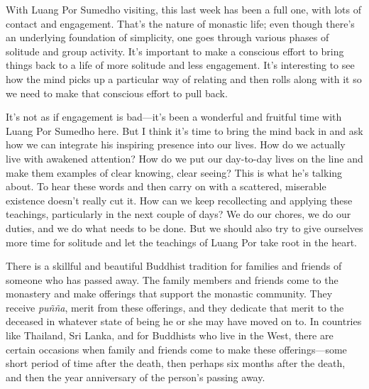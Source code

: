 
With Luang Por Sumedho visiting, this last week has been a full one, 
with lots of contact and engagement. That's the nature of monastic 
life; even though there's an underlying foundation of simplicity, one 
goes through various phases of solitude and group activity. It's 
important to make a conscious effort to bring things back to a life of 
more solitude and less engagement. It's interesting to see how the mind 
picks up a particular way of relating and then rolls along with it so 
we need to make that conscious effort to pull back.

It's not as if engagement is bad---it's been a wonderful and fruitful 
time with Luang Por Sumedho here. But I think it's time to bring the 
mind back in and ask how we can integrate his inspiring presence into 
our lives. How do we actually live with awakened attention? How do we 
put our day-to-day lives on the line and make them examples of clear 
knowing, clear seeing? This is what he's talking about. To hear these 
words and then carry on with a scattered, miserable existence doesn't 
really cut it. How can we keep recollecting and applying these 
teachings, particularly in the next couple of days? We do our chores, 
we do our duties, and we do what needs to be done. But we should also 
try to give ourselves more time for solitude and let the teachings of 
Luang Por take root in the heart.


There is a skillful and beautiful Buddhist tradition for families and 
friends of someone who has passed away. The family members and friends 
come to the monastery and make offerings that support the monastic 
community. They receive \emph{puñña}, merit from these offerings, and 
they dedicate that merit to the deceased in whatever state of being he 
or she may have moved on to. In countries like Thailand, Sri Lanka, and 
for Buddhists who live in the West, there are certain occasions when 
family and friends come to make these offerings---some short period of 
time after the death, then perhaps six months after the death, and then 
the year anniversary of the person's passing away.

